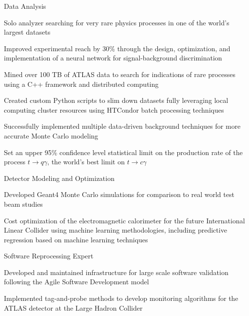 
\begin{cventries}
  \cventry
    {Data Analysis} %
    {} %
    {} %
    {} %
    {
      \begin{cvitems} %
        \item {Solo analyzer searching for very rare physics processes in one of the world's largest datasets}
        \item {Improved experimental reach by 30\% through the design, optimization, and implementation of a neural network for signal-background discrimination}
        \item {Mined over 100 TB of ATLAS data to search for indications of rare processes using a C++ framework and distributed computing}
         \item{Created custom Python scripts to slim down datasets fully leveraging local computing cluster resources using HTCondor batch processing techniques}
         \item{Successfully implemented multiple data-driven background techniques for more accurate Monte Carlo modeling}
         \item{Set an upper 95\% confidence level statistical limit on the production rate of the process $t\rightarrow q\gamma$, the world's best limit on $t\rightarrow c\gamma$}
         	\end{cvitems}
    } 

    \cventry
    {Detector Modeling and Optimization}
    {}
    {}
    {}
    {
    \begin{cvitems}
    	\item Developed Geant4 Monte Carlo simulations for comparison to real world test beam studies
    	\item Cost optimization of the electromagnetic calorimeter for the future International Linear Collider using machine learning methodologies, including predictive regression based on machine learning techniques
    \end{cvitems}
    }
    
    \cventry
    {Software Reprocessing Expert} %
    {} %
    {} %
    {} %
    {
      \begin{cvitems} %
        \item {Developed and maintained infrastructure for large scale software validation following the Agile Software Development model }
        \item {Implemented tag-and-probe methods to develop monitoring algorithms for the ATLAS detector at the Large Hadron Collider}
      \end{cvitems}
    }     
    

\end{cventries}
